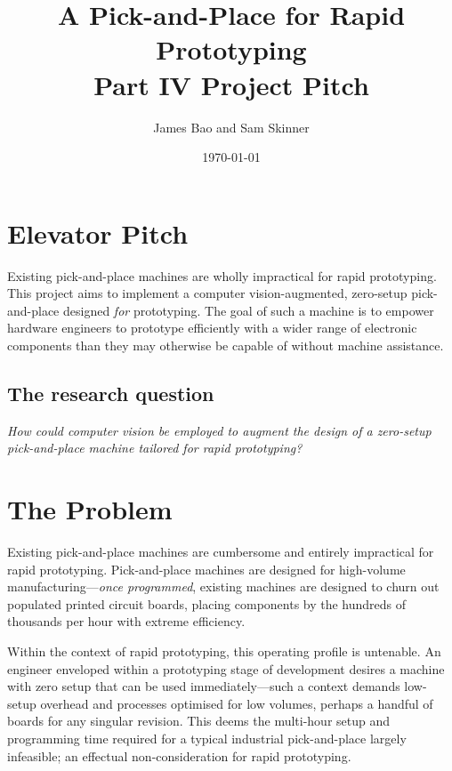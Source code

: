 \documentclass[a4paper, 11pt]{article}
\title{A Pick-and-Place for Rapid Prototyping\\\medskip Part IV Project Pitch}
\author{James Bao and Sam Skinner}
\date{\today}
\begin{document}
\maketitle

\section{Elevator Pitch}

Existing pick-and-place machines are wholly impractical for rapid prototyping.
This project aims to implement a computer vision-augmented, zero-setup pick-and-place designed \emph{for} prototyping.
The goal of such a machine is to empower hardware engineers to prototype efficiently with a wider range of electronic components than they may otherwise be capable of without machine assistance.

\subsection{The research question}

\emph{How could computer vision be employed to augment the design of a zero-setup pick-and-place machine tailored for rapid prototyping?}

\tableofcontents

\pagebreak
{}

\section{The Problem}

Existing pick-and-place machines are cumbersome and entirely impractical for rapid prototyping.
Pick-and-place machines are designed for high-volume manufacturing—\emph{once programmed}, existing machines are designed to churn out populated printed circuit boards, placing components by the hundreds of thousands per hour \cite{cite:ztar-ysm40r} with extreme efficiency.

Within the context of rapid prototyping, this operating profile is untenable.
An engineer enveloped within a prototyping stage of development desires a machine with zero setup that can be used immediately—such a context demands low-setup overhead and processes optimised for low volumes, perhaps a handful of boards for any singular revision.
This deems the multi-hour setup and programming time \cite{cite:setup-time-reduction} required for a typical industrial pick-and-place largely infeasible; an effectual non-consideration for rapid prototyping.
\end{document}
